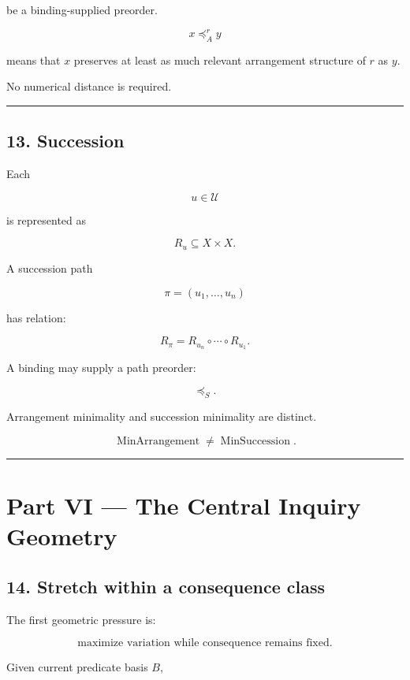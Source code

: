 \documentclass[
]{article}
\begin{document}
be a binding-supplied preorder.

\[
x\preceq_A^r y
\]

means that \(x\) preserves at least as much relevant arrangement
structure of \(r\) as \(y\).

No numerical distance is required.

\begin{center}\rule{0.5\linewidth}{0.5pt}\end{center}

\subsection{13. Succession}\label{succession}

Each

\[
u\in\mathcal U
\]

is represented as

\[
R_u\subseteq X\times X.
\]

A succession path

\[
\pi=(u_1,\ldots,u_n)
\]

has relation:

\[
R_\pi
=
R_{u_n}\circ\cdots\circ R_{u_1}.
\]

A binding may supply a path preorder:

\[
\preceq_S.
\]

Arrangement minimality and succession minimality are distinct.

\[
\boxed{
\operatorname{MinArrangement}
\neq
\operatorname{MinSuccession}.
}
\]

\begin{center}\rule{0.5\linewidth}{0.5pt}\end{center}

\section{Part VI --- The Central Inquiry
Geometry}\label{part-vi-the-central-inquiry-geometry}

\subsection{14. Stretch within a consequence
class}\label{stretch-within-a-consequence-class}

The first geometric pressure is:

\[
\boxed{
\text{maximize variation while consequence remains fixed.}
}
\]

Given current predicate basis \(B\),
\end{document}
